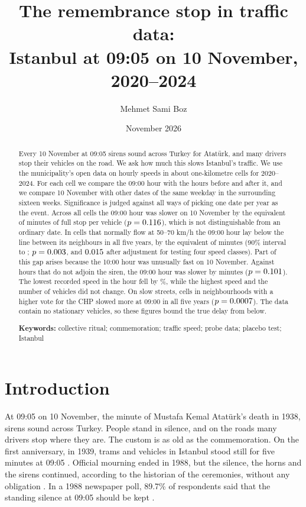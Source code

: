 \documentclass[11pt,a4paper]{article}
\title{The remembrance stop in traffic data:\\ Istanbul at 09:05 on 10 November, 2020--2024}
\author{Mehmet Sami Boz}
\date{November 2026}
\begin{document}
\maketitle

\begin{abstract}
\noindent Every 10 November at 09:05 sirens sound across Turkey for Atatürk, and many drivers stop their
vehicles on the road. We ask how much this slows Istanbul's traffic. We use the municipality's open
data on hourly speeds in about \cellsAll{} one-kilometre cells for 2020--2024. For each cell we
compare the 09:00 hour with the hours before and after it, and we compare 10 November with
\nPlacebo{} other dates of the same weekday in the surrounding sixteen weeks. Significance is judged
against all \nAssign{} ways of picking one date per year as the event. Across all cells the 09:00 hour
was slower on 10 November by the equivalent of \minAll{} minutes of full stop per vehicle
($p = 0.116$), which is not distinguishable from an ordinary date. In cells that normally flow at
50--70 km/h the 09:00 hour lay below the line between its neighbours in all five years, by the
equivalent of \minFast{} minutes (90\% interval \ciFastLo{} to \ciFastHi; $p = 0.003$, and
$0.015$ after adjustment for testing four speed classes). Part of this gap arises because the
10:00 hour was unusually fast on 10 November. Against hours that do not adjoin the siren, the 09:00
hour was slower by \minRobFar{} minutes ($p = 0.101$). The lowest recorded speed in the hour
fell by \minspFastPct\%, while the highest speed and the number of vehicles did not change. On slow
streets, cells in neighbourhoods with a higher vote for the CHP slowed more at 09:00 in all five years
($p = 0.0007$). The data
contain no stationary vehicles, so these figures bound the true delay from below.

\medskip\noindent\textbf{Keywords:} collective ritual; commemoration; traffic speed; probe data;
placebo test; Istanbul
\end{abstract}

\section{Introduction}

At 09:05 on 10 November, the minute of Mustafa Kemal Atatürk's death in 1938, sirens sound across
Turkey. People stand in silence, and on the roads many drivers stop where they are. The custom is as
old as the commemoration. On the first anniversary, in 1939, trams and vehicles in Istanbul stood
still for five minutes at 09:05 \citep[p.~142]{uzun2019}. Official mourning ended in 1988, but the
silence, the horns and the sirens continued, according to the historian of the ceremonies, without
any obligation \citep{uzun2019}. In a 1988 newspaper poll, 89.7\% of respondents said that the
standing silence at 09:05 should be kept \citep[p.~159]{uzun2019}.
\end{document}
